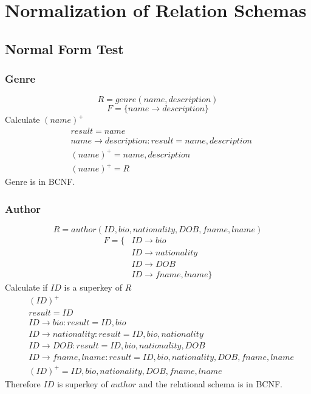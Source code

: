 \documentclass[fleqn]{scrreprt}
\begin{document}
\newpage
\section{Normalization of Relation Schemas}
\subsection{Normal Form Test}
\subsubsection{Genre}
\begin{equation*}
    R = genre(name, description)
\end{equation*}
\begin{equation*}
    F = \{name \rightarrow description\}
\end{equation*}
Calculate $(name)^+$
\begin{align*}
    & result = name\\
    & name \rightarrow description : result = name, description\\
    & (name)^+ = name, description\\
    & (name)^+ = R
\end{align*}
Genre is in BCNF.

\subsubsection{Author}
\begin{equation*}
    R = author(ID, bio, nationality, DOB, fname, lname)
\end{equation*}
\begin{align*}
    F = \{ & ID \rightarrow bio\\
          & ID \rightarrow nationality\\
          & ID \rightarrow DOB\\
          & ID \rightarrow fname, lname \}
\end{align*}
Calculate if $ID$ is a superkey of $R$
\begin{align*}
    & (ID)^+\\
    & result = ID\\
    & ID \rightarrow bio : result = ID, bio\\
    & ID \rightarrow nationality : result = ID, bio, nationality\\
    & ID \rightarrow DOB : result = ID, bio, nationality, DOB\\
    & ID \rightarrow fname, lname : result = ID, bio, nationality, DOB, fname, lname\\
    & (ID)^+ = ID, bio, nationality, DOB, fname, lname
\end{align*}
Therefore $ID$ is superkey of $author$ and the relational schema is in BCNF.
\end{document}
